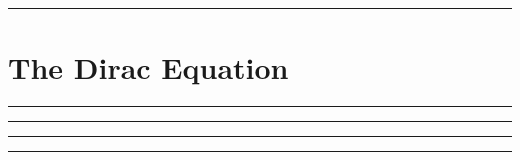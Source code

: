 
\noindent\rule{7in}{2.8pt}
\section{The Dirac Equation}
    
\begin{problem}{4.1}

\end{problem}
\begin{solution}

\end{solution}

\noindent\rule{7in}{1.5pt}


\begin{problem}{4.2}

\end{problem}
\begin{solution}

\end{solution}

\noindent\rule{7in}{1.5pt}


\begin{problem}{4.3}

\end{problem}
\begin{solution}

\end{solution}

\noindent\rule{7in}{1.5pt}


\begin{problem}{4.4}

\end{problem}
\begin{solution}

\end{solution}

\noindent\rule{7in}{1.5pt}


